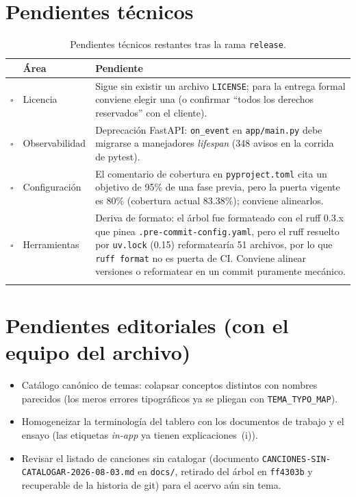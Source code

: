 \documentclass[11pt,letterpaper,twoside]{report}
\newcommand{\pend}{\textcolor{cenidim-mostaza}{$\square$}}
\newcommand{\codigo}[1]{\texttt{#1}}
\begin{document}
\section{Pendientes técnicos}
\begin{longtable}{p{0.9cm}p{3.4cm}p{9.4cm}}
  \toprule
  & \textbf{Área} & \textbf{Pendiente} \\
  \midrule
  \endhead
  \pend & Licencia &
    Sigue sin existir un archivo \codigo{LICENSE}; para la entrega
    formal conviene elegir una (o confirmar ``todos los derechos
    reservados'' con el cliente). \\
  \pend & Observabilidad &
    Deprecación FastAPI: \codigo{on_event} en \codigo{app/main.py}
    debe migrarse a manejadores \emph{lifespan} (348 avisos en la
    corrida de pytest). \\
  \pend & Configuración &
    El comentario de cobertura en \codigo{pyproject.toml} cita un
    objetivo de 95\% de una fase previa, pero la puerta vigente es
    80\% (cobertura actual 83.38\%); conviene alinearlos. \\
  \pend & Herramientas &
    Deriva de formato: el árbol fue formateado con el ruff 0.3.x que
    pinea \codigo{.pre-commit-config.yaml}, pero el ruff resuelto por
    \codigo{uv.lock} (0.15) reformatearía 51 archivos, por lo que
    \codigo{ruff format} no es puerta de CI. Conviene alinear
    versiones o reformatear en un commit puramente mecánico. \\
  \bottomrule
  \caption{Pendientes técnicos restantes tras la rama \codigo{release}.}
  \label{tab:pendientes-tec}
\end{longtable}

\section{Pendientes editoriales (con el equipo del archivo)}
\begin{itemize}
  \item Catálogo canónico de temas: colapsar conceptos distintos con
        nombres parecidos (los meros errores tipográficos ya se pliegan
        con \codigo{TEMA_TYPO_MAP}).
  \item Homogeneizar la terminología del tablero con los documentos
        de trabajo y el ensayo (las etiquetas \emph{in-app} ya tienen
        explicaciones \raisebox{0pt}{$\circledast$}\,(i)).
  \item \begin{sloppypar}Revisar el listado de canciones sin catalogar
        (documento \codigo{CANCIONES-SIN-CATALOGAR-2026-08-03.md} en
        \codigo{docs/}, retirado del árbol en \codigo{ff4303b} y
        recuperable de la historia de git) para el acervo aún sin
        tema.\end{sloppypar}
\end{itemize}
\end{document}
